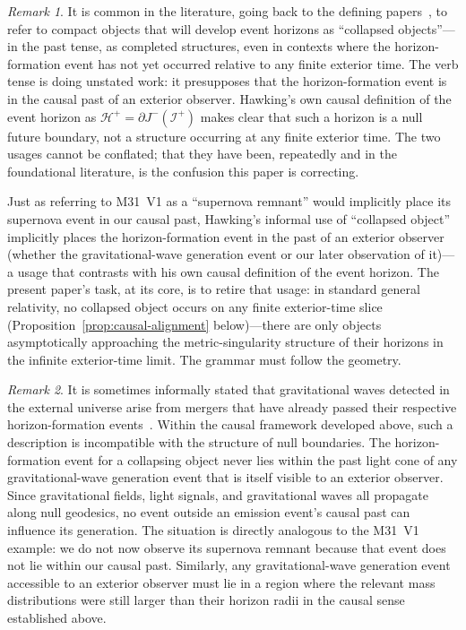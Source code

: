 \documentclass[11pt,a4paper]{article}
\theoremstyle{plain}
\theoremstyle{remark}
\newtheorem{remark}{Remark}
\begin{document}
\begin{remark}
It is common in the literature, going back to the defining papers~\cite{hawking1971,Penrose1969}, to refer to compact objects that will develop event horizons as ``collapsed objects''---in the past tense, as completed structures, even in contexts where the horizon-formation event has not yet occurred relative to any finite exterior time. The verb tense is doing unstated work: it presupposes that the horizon-formation event is in the causal past of an exterior observer. Hawking's own causal definition of the event horizon as $\mathcal{H}^+ = \partial J^-(\mathcal{I}^+)$ makes clear that such a horizon is a null future boundary, not a structure occurring at any finite exterior time. The two usages cannot be conflated; that they have been, repeatedly and in the foundational literature, is the confusion this paper is correcting.

Just as referring to M31~V1 as a ``supernova remnant'' would implicitly place its supernova event in our causal past, Hawking's informal use of ``collapsed object'' implicitly places the horizon-formation event in the past of an exterior observer (whether the gravitational-wave generation event or our later observation of it)---a usage that contrasts with his own causal definition of the event horizon. The present paper's task, at its core, is to retire that usage: in standard general relativity, no collapsed object occurs on any finite exterior-time slice (Proposition~\ref{prop:causal-alignment} below)---there are only objects asymptotically approaching the metric-singularity structure of their horizons in the infinite exterior-time limit. The grammar must follow the geometry.
\end{remark}

\begin{remark}
It is sometimes informally stated that gravitational waves detected in the external universe arise from mergers that have already passed their respective horizon-formation events~\cite{abbott2016}. Within the causal framework developed above, such a description is incompatible with the structure of null boundaries. The horizon-formation event for a collapsing object never lies within the past light cone of any gravitational-wave generation event that is itself visible to an exterior observer. Since gravitational fields, light signals, and gravitational waves all propagate along null geodesics, no event outside an emission event’s causal past can influence its generation. The situation is directly analogous to the M31~V1 example: we do not now observe its supernova remnant because that event does not lie within our causal past. Similarly, any gravitational-wave generation event accessible to an exterior observer must lie in a region where the relevant mass distributions were still larger than their horizon radii in the causal sense established above.
\end{remark}
\end{document}
